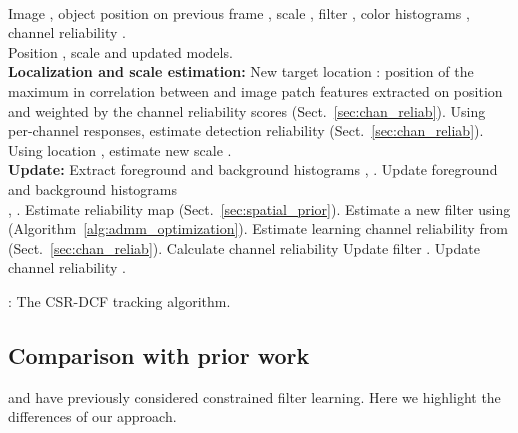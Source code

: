 \documentclass[twocolumn]{article}
\begin{document}
\begin{algorithm}[!t]
\begin{algorithmic}[1]
 \REQUIRE {~}\\
    Image , object position on previous frame , scale , filter , color histograms , channel reliability .
 \ENSURE {~}\\
    Position , scale  and updated models.
 \\\hspace{-0.6cm}\textbf{Localization and scale estimation:}
 	\STATE New target location : position of the maximum in correlation between  and image patch features  extracted on position 
 and weighted by the channel reliability scores  (Sect.~\ref{sec:chan_reliab}).    
    \STATE Using per-channel responses, estimate detection reliability  (Sect.~\ref{sec:chan_reliab}).
	\STATE Using location , estimate new scale .
 \\\hspace{-0.6cm}\textbf{Update:}
 	\STATE Extract foreground and background histograms , .
  	\STATE Update foreground and background histograms \\ , .\label{alg-step:update_histograms}
	\STATE Estimate reliability map   (Sect.~\ref{sec:spatial_prior}).
	\STATE Estimate a new filter  using  (Algorithm~\ref{alg:admm_optimization}).
	\STATE Estimate learning channel reliability  from  (Sect.~\ref{sec:chan_reliab}).
    \STATE Calculate channel reliability 
    \STATE Update filter .\label{alg-step:update_h}
    \STATE Update channel reliability .\label{alg-step:update_w}
\end{algorithmic}
\caption{\label{alg:tracking_algorithm}: The CSR-DCF tracking algorithm.}
\end{algorithm}

\subsection{Comparison with prior work}  \label{sec:differences}

\cite{cfwlb_cvpr2015} and \cite{srdcf_iccv2015} have previously considered constrained filter learning. Here we highlight the differences of our approach.
\end{document}
